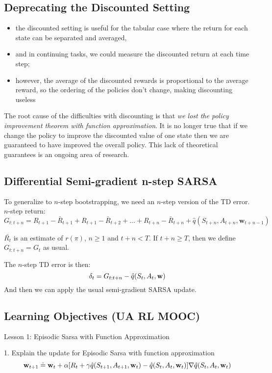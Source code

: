 \documentclass[sutton_barto_notes.tex]{subfiles}
\begin{document}
\subsection{Deprecating the Discounted Setting}

\begin{itemize}
\item the discounted setting is useful for the tabular case where the return for each state can be separated and averaged,
\item and in continuing tasks, we could measure the discounted return at each time step;
\item however, the average of the discounted rewards is proportional to the average reward, so the ordering of the policies don't change, making discounting useless
\end{itemize}

The root cause of the difficulties with discounting is that \textit{we lost the policy improvement theorem with function approximation}.
It is no longer true that if we change the policy to improve the discounted value of one state then we are guaranteed to have improved the overall policy. This lack of theoretical guarantees is an ongoing area of research.

\subsection{Differential Semi-gradient n-step SARSA}

To generalize to $n$-step bootstrapping, we need an $n$-step version of the TD error. $n$-step return:
$$ G_{t:t+n} = R_{t+1} - \bar{R}_{t+1} + R_{t+1} - \bar{R}_{t+2} + ... + R_{t+n} - \bar{R}_{t+n} + \hat{q}(S_{t+n}, A_{t+n}, \mathbf{w}_{t+n-1}) $$

$\bar{R_t}$ is an estimate of $r(\pi)$, $n \geq 1$ and $t + n < T$.
If $t + n \geq T$, then we define $G_{t:t+n} = G_t$ as usual.

The $n$-step TD error is then:
$$ \delta_t = G_{t:t+n} - \hat{q}(S_t, A_t, \operatorname*{\mathbf{w}}) $$
And then we can apply the usual semi-gradient SARSA update.

\subsection{Learning Objectives (UA RL MOOC)}
Lesson 1: Episodic Sarsa with Function Approximation 

1. Explain the update for Episodic Sarsa with function approximation 
$${\operatorname*{\mathbf{w}}}_{t+1} \doteq {\operatorname*{\mathbf{w}}}_t + \alpha[R_{t} + \gamma\hat{q}(S_{t+1}, A_{t+1}, {\operatorname*{\mathbf{w}}}_t) - \hat{q}(S_t, A_t, {\operatorname*{\mathbf{w}}}_t)]\nabla\hat{q}(S_t, A_t, {\operatorname*{\mathbf{w}}}_t)$$
\end{document}
